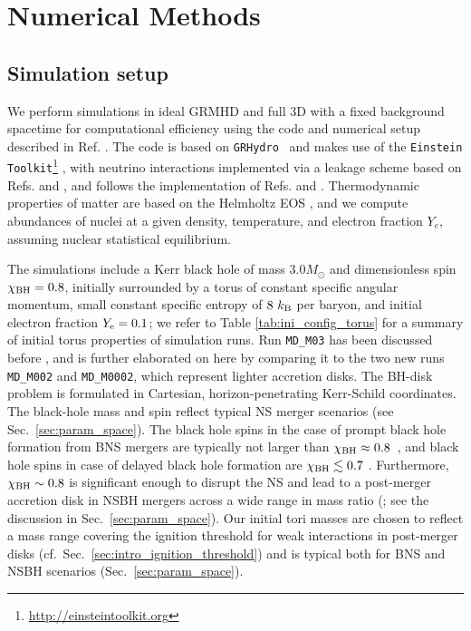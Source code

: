 \section{Numerical Methods}
\label{sec:methods}

\subsection{Simulation setup}\label{subsec:sim_setup}
We perform simulations in ideal GRMHD and full 3D with a fixed background spacetime for computational efficiency using the code and numerical setup described in Ref. \cite{Siegel:2017jug}. The code is based on \texttt{GRHydro}~\cite{mosta_grhydro:_2014} and makes use of the \texttt{Einstein Toolkit}\footnote{\href{http://einsteintoolkit.org}{http://einsteintoolkit.org}} \cite{maria_babiuc_hamilton_2019_3522086,loffler_einstein_2012,Schnetter:2003rb,Goodale:2002a,Thornburg:2003sf}, with neutrino interactions implemented via a leakage scheme based on Refs. \cite{Bruenn:1985en} and \cite{ruffert_coalescing_1996}, and follows the implementation of Refs. \cite{galeazzi_implementation_2013} and \cite{radice_dynamical_2016}. Thermodynamic properties of matter are based on the Helmholtz EOS \cite{timmes_accuracy_1999,timmes_accuracy_2000}, and we compute abundances of nuclei at a given density, temperature, and electron fraction $Y_e$, assuming nuclear statistical equilibrium.

The simulations include a Kerr black hole of mass $3.0 M_\odot$ and dimensionless spin $\chi_{\rm BH} = 0.8$, initially surrounded by a torus of constant specific angular momentum, small constant specific entropy of $8~k_{\rm B}$ per baryon, and initial electron fraction $Y_{\rm e} = 0.1$; we refer to Table \ref{tab:ini_config_torus} for a summary of initial torus properties of simulation runs. Run \texttt{MD\_M03} has been discussed before \cite{siegel_three-dimensional_2017,Siegel:2017jug}, and is further elaborated on here by comparing it to the two new runs \texttt{MD\_M002} and \texttt{MD\_M0002}, which represent lighter accretion disks. The BH-disk problem is formulated in Cartesian, horizon-penetrating Kerr-Schild coordinates. The black-hole mass and spin reflect typical NS merger scenarios (see Sec.~\ref{sec:param_space}). The black hole spins in the case of prompt black hole formation from BNS mergers are typically not larger than $\chi_{\rm BH} \approx 0.8$~\cite{kiuchi_longterm_2009,rezzolla_accurate_2010,bernuzzi_mergers_2014,kastaun_black_2013}, and black hole spins in case of delayed black hole formation are $\chi_{\rm BH} \lesssim 0.7$ \cite{sekiguchi_dynamical_2016}. Furthermore, $\chi_{\rm BH} \sim 0.8$ is significant enough to disrupt the NS and lead to a post-merger accretion disk in NSBH mergers across a wide range in mass ratio (\cite{foucart_black-hole-neutron-star_2012}; see the discussion in Sec.~\ref{sec:param_space}). Our initial tori masses are chosen to reflect a mass range covering the ignition threshold for weak interactions in post-merger disks (cf.~Sec.~\ref{sec:intro_ignition_threshold}) and is typical both for BNS and NSBH scenarios (Sec.~\ref{sec:param_space}).

